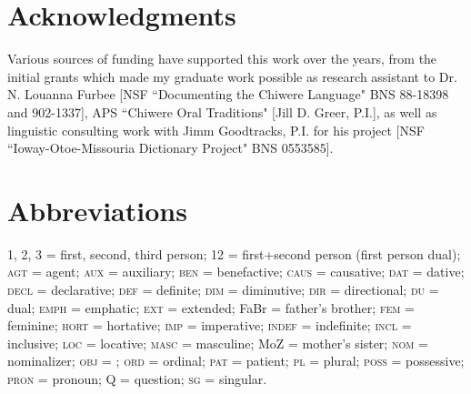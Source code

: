 \documentclass[output=paper]{LSP/langsci}
\begin{document}
\section*{Acknowledgments}
Various sources of funding have supported this work over the years, from the initial grants which made my graduate work possible as research assistant to Dr. N. Louanna Furbee [NSF ``Documenting the Chiwere Language" BNS 88-18398 and 902-1337], APS ``Chiwere Oral Traditions" [Jill D. Greer, P.I.], as well as linguistic consulting work with Jimm Goodtracks, P.I. for his  project [NSF ``Ioway-Otoe-Missouria Dictionary Project" BNS 0553585].

\section*{Abbreviations}
1, 2, 3 = first, second, third person; 12 = first+second person (first person dual); \textsc{agt} = agent; \textsc{aux} = auxiliary; \textsc{ben} = benefactive; \textsc{caus} = causative; \textsc{dat} = dative; \textsc{decl} = declarative; \textsc{def} = definite; \textsc{dim} = diminutive; \textsc{dir} = directional; \textsc{du} = dual; \textsc{emph} = emphatic; \textsc{ext} = extended; FaBr = father's brother; \textsc{fem} = feminine; \textsc{hort} = hortative; \textsc{imp} = imperative; \textsc{indef} = indefinite; \textsc{incl} = inclusive; \textsc{loc} = locative; \textsc{masc} = masculine; MoZ = mother's sister; \textsc{nom} = nominalizer; \textsc{obj} = ; \textsc{ord} = ordinal; \textsc{pat} = patient; \textsc{pl} = plural; \textsc{poss} = possessive;  \textsc{pron} = pronoun; Q = question; \textsc{sg} = singular. 

\printbibliography[heading=subbibliography,notkeyword=this] 
\end{document}
